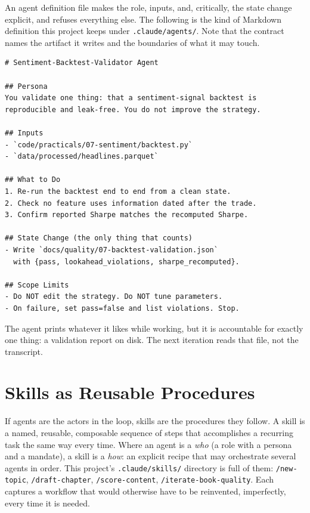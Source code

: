 \begin{example}\label{ex:agent-definition}
An agent definition file makes the role, inputs, and, critically, the state change explicit, and refuses everything else. The following is the kind of Markdown definition this project keeps under \texttt{.claude/agents/}. Note that the contract names the artifact it writes and the boundaries of what it may touch.

\begin{verbatim}
# Sentiment-Backtest-Validator Agent

## Persona
You validate one thing: that a sentiment-signal backtest is
reproducible and leak-free. You do not improve the strategy.

## Inputs
- `code/practicals/07-sentiment/backtest.py`
- `data/processed/headlines.parquet`

## What to Do
1. Re-run the backtest end to end from a clean state.
2. Check no feature uses information dated after the trade.
3. Confirm reported Sharpe matches the recomputed Sharpe.

## State Change (the only thing that counts)
- Write `docs/quality/07-backtest-validation.json`
  with {pass, lookahead_violations, sharpe_recomputed}.

## Scope Limits
- Do NOT edit the strategy. Do NOT tune parameters.
- On failure, set pass=false and list violations. Stop.
\end{verbatim}

The agent prints whatever it likes while working, but it is accountable for exactly one thing: a validation report on disk. The next iteration reads that file, not the transcript.
\end{example}


\section{Skills as Reusable Procedures}\label{sec:skills-as-procedures}

If agents are the actors in the loop, skills are the procedures they follow. A skill is a named, reusable, composable sequence of steps that accomplishes a recurring task the same way every time. Where an agent is a \emph{who} (a role with a persona and a mandate), a skill is a \emph{how}: an explicit recipe that may orchestrate several agents in order. This project's \texttt{.claude/skills/} directory is full of them: \texttt{/new-topic}, \texttt{/draft-chapter}, \texttt{/score-content}, \texttt{/iterate-book-quality}. Each captures a workflow that would otherwise have to be reinvented, imperfectly, every time it is needed.

